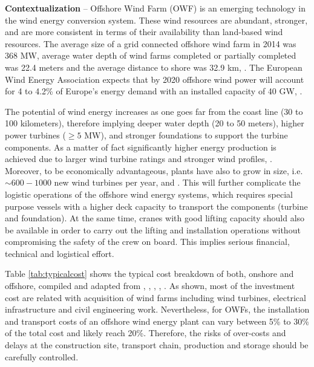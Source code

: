 \textbf{Contextualization} --
Offshore Wind Farm (OWF) is an emerging technology in the wind energy conversion system. These wind resources are abundant, stronger, and are more consistent in terms of their availability than land-based wind resources. The average size of a grid connected offshore wind farm in 2014 was 368 MW, average water depth of wind farms completed or partially completed was 22.4 meters and the average distance to shore was 32.9 km, \cite{Giorgio2015}. The European Wind Energy Association expects that by 2020 offshore wind power will account for 4 to 4.2\% of Europe's energy demand with an installed capacity of 40 GW, \cite{EWEA2011, Kaldellis2013}.

The potential of wind energy increases as one goes far from the coast line (30 to 100 kilometers), therefore implying deeper water depth (20 to 50 meters), higher power turbines ($\geq 5$ MW), and stronger foundations to support the turbine components. As a matter of fact significantly higher energy production is achieved due to larger wind turbine ratings and stronger wind profiles, \cite{Sun2012298}. Moreover, to be economically advantageous, plants have also to grow in size, i.e. $\sim600-1000$ new wind turbines per year, \cite{EWEA2011} and \cite{Kaldellis2013}. This will further complicate the logistic operations of the offshore wind energy systems, which requires special purpose vessels with a higher deck capacity to transport the components (turbine and foundation). At the same time, cranes with good lifting capacity should also be available in order to carry out the lifting and installation operations without compromising the safety of the crew on board. This implies serious financial, technical and logistical effort.

Table \ref{tab:typicalcost} shows the typical cost breakdown of both, onshore and offshore, compiled and adapted from \cite{Henderson2003}, \cite{Junginger2004},  \cite{UK10}, \cite{TCE12}, \cite{IRENA12}. As shown, most of the investment cost are related with acquisition of wind farms including wind turbines, electrical infrastructure and civil engineering work. Nevertheless, for OWFs, the installation and transport costs of an offshore wind energy plant can vary between 5\% to 30\% of the total cost and likely reach 20\%. Therefore, the risks of over-costs and delays at the construction site, transport chain, production and storage should be carefully controlled.
